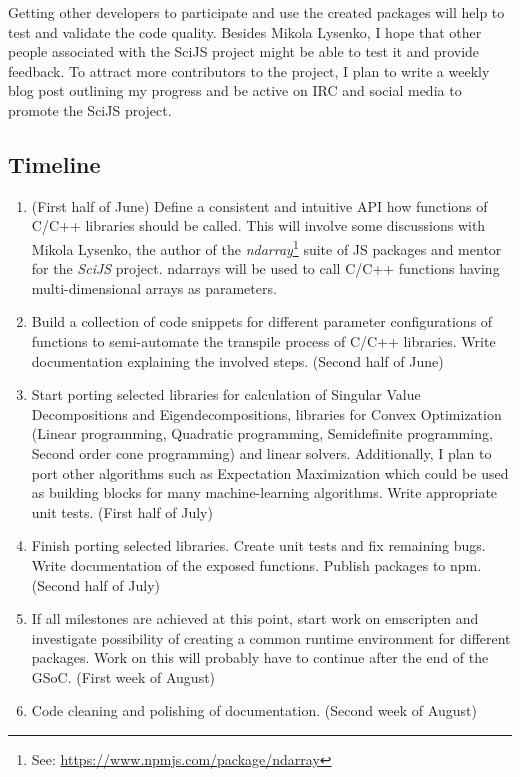 \documentclass{scrartcl}
\begin{document}
Getting other developers to participate and use the created packages will help to test and validate the code quality. Besides Mikola Lysenko, I hope that other people associated with the SciJS project might be able to test it and provide feedback. To attract more contributors to the project, I plan to write a weekly blog post outlining my progress and be active on IRC and social media to promote the SciJS project.

\subsection*{Timeline}

\begin{enumerate}
\item (First half of June) Define a consistent and intuitive API how functions of C/C++ libraries should be called. This will involve some discussions with Mikola Lysenko, the author of the \emph{ndarray}\footnote{See: \url{https://www.npmjs.com/package/ndarray}} suite of JS packages and mentor for the \emph{SciJS} project. ndarrays will be used to call C/C++ functions having multi-dimensional arrays as parameters. 
\item Build a collection of code snippets for different parameter configurations of functions to semi-automate the transpile process of C/C++ libraries. Write documentation explaining the involved steps. (Second half of June) 
\item Start porting selected libraries for calculation of Singular Value Decompositions and Eigendecompositions, libraries for Convex Optimization (Linear programming, Quadratic programming, Semidefinite programming, Second order cone programming) and linear solvers. Additionally, I plan to port other algorithms such as Expectation Maximization which could be used as building blocks for many machine-learning algorithms. Write appropriate unit tests. (First half of July)
\item Finish porting selected libraries. Create unit tests and fix remaining bugs. Write documentation of the exposed functions. Publish packages to npm. (Second half of July) 
\item If all milestones are achieved at this point, start work on emscripten and investigate possibility of creating a common runtime environment for different packages. Work on this will probably have to continue after the end of the GSoC. (First week of August) 
\item Code cleaning and polishing of documentation. (Second week of August)
\end{enumerate}
\end{document}
